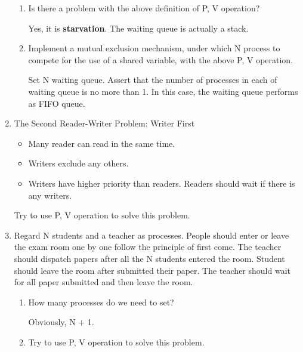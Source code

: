 \begin{enumerate}
    \begin{enumerate}
        \item Is there a problem with the above definition of P, V operation?
        
        Yes, it is \textbf{starvation}. The waiting queue is actually a stack. 
    
        \item Implement a mutual exclusion mechanism, under which N process to compete for the use of a shared variable, with the above P, V operation.
        
        Set N waiting queue. Assert that the number of processes in each of waiting queue is no more than 1. In this case, the waiting queue performs as FIFO queue.
        
    \end{enumerate}
    
    \item The Second Reader-Writer Problem: Writer First
    
    \begin{itemize}
        \item Many reader can read in the same time.
        \item Writers exclude any others.
        \item Writers have higher priority than readers. Readers should wait if there is any writers.
    \end{itemize}
    
    Try to use P, V operation to solve this problem.
    
    

    
    \item Regard N students and a teacher as processes. People should enter or leave the exam room one by one follow the principle of first come. The teacher should dispatch papers after all the N students entered the room. Student should leave the room after submitted their paper. The teacher should wait for all paper submitted and then leave the room.

    \begin{enumerate}
        \item How many processes do we need to set?
        
        Obviously, N + 1.
        
        \item Try to use P, V operation to solve this problem.
        
        
    
        
    \end{enumerate}
\end{enumerate}

